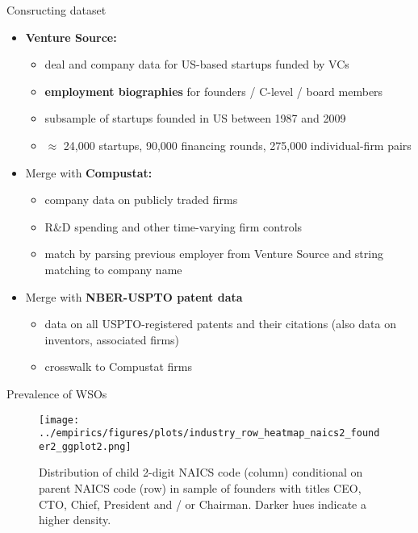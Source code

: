 \documentclass[english,usenames,dvipsnames]{beamer}
\begin{document}
\begin{frame}{Consructing dataset}
	\begin{itemize}
		\item<+-> \alert{\textbf{Venture Source:}} 
		\begin{itemize}
			\item deal and company data for US-based startups funded by VCs
			\item \alert{\textbf{employment biographies}} for founders / C-level / board members
			\item subsample of startups founded in US between 1987 and 2009
			\item $\approx$ 24,000 startups, 90,000 financing rounds, 275,000 individual-firm pairs
		\end{itemize}
		\medskip
		\item<+-> Merge with \alert{\textbf{Compustat:}}
		\begin{itemize}
			\item company data on publicly traded firms 
			\item R\&D spending and other time-varying firm controls
			\item match by parsing previous employer from Venture Source and string matching to company name
		\end{itemize}
		\medskip
		\item<+-> Merge with \alert{\textbf{NBER-USPTO patent data}}
		\begin{itemize}
			\item data on all USPTO-registered patents and their citations (also data on inventors, associated firms)
			\item crosswalk to Compustat firms
		\end{itemize}
	\end{itemize}
\end{frame}

\begin{frame}{Prevalence of WSOs}
	\begin{figure}[]
		\centering
		\texttt{[image: ../empirics/figures/plots/industry\_row\_heatmap\_naics2\_founder2\_ggplot2.png]}
		\caption{Distribution of child 2-digit NAICS code (column) conditional on parent NAICS code (row) in sample of founders with titles CEO, CTO, Chief, President and / or Chairman. Darker hues indicate a higher density.}
		\label{figure:industry_row_heatmap_naics2_founder2}
	\end{figure}
\end{frame}
\end{document}
